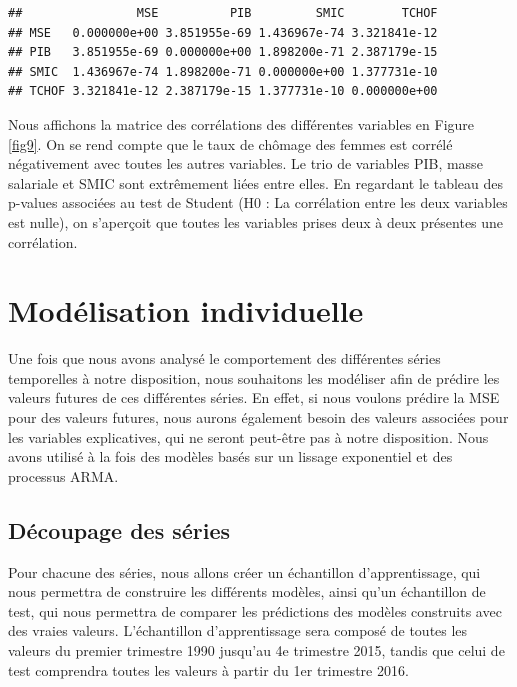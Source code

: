 \documentclass[11pt,]{article}
\begin{document}
\begin{verbatim}
##                MSE          PIB         SMIC        TCHOF
## MSE   0.000000e+00 3.851955e-69 1.436967e-74 3.321841e-12
## PIB   3.851955e-69 0.000000e+00 1.898200e-71 2.387179e-15
## SMIC  1.436967e-74 1.898200e-71 0.000000e+00 1.377731e-10
## TCHOF 3.321841e-12 2.387179e-15 1.377731e-10 0.000000e+00
\end{verbatim}

Nous affichons la matrice des corrélations des différentes variables en
Figure \ref{fig9}. On se rend compte que le taux de chômage des femmes
est corrélé négativement avec toutes les autres variables. Le trio de
variables PIB, masse salariale et SMIC sont extrêmement liées entre
elles. En regardant le tableau des p-values associées au test de Student
(H0 : La corrélation entre les deux variables est nulle), on s'aperçoit
que toutes les variables prises deux à deux présentes une corrélation.

\section{\texorpdfstring{Modélisation individuelle
\label{MI}}{Modélisation individuelle }}\label{modelisation-individuelle}

Une fois que nous avons analysé le comportement des différentes séries
temporelles à notre disposition, nous souhaitons les modéliser afin de
prédire les valeurs futures de ces différentes séries. En effet, si nous
voulons prédire la MSE pour des valeurs futures, nous aurons également
besoin des valeurs associées pour les variables explicatives, qui ne
seront peut-être pas à notre disposition. Nous avons utilisé à la fois
des modèles basés sur un lissage exponentiel et des processus ARMA.

\subsection{Découpage des séries}\label{decoupage-des-series}

Pour chacune des séries, nous allons créer un échantillon
d'apprentissage, qui nous permettra de construire les différents
modèles, ainsi qu'un échantillon de test, qui nous permettra de comparer
les prédictions des modèles construits avec des vraies valeurs.
L'échantillon d'apprentissage sera composé de toutes les valeurs du
premier trimestre 1990 jusqu'au 4e trimestre 2015, tandis que celui de
test comprendra toutes les valeurs à partir du 1er trimestre 2016.
\end{document}
